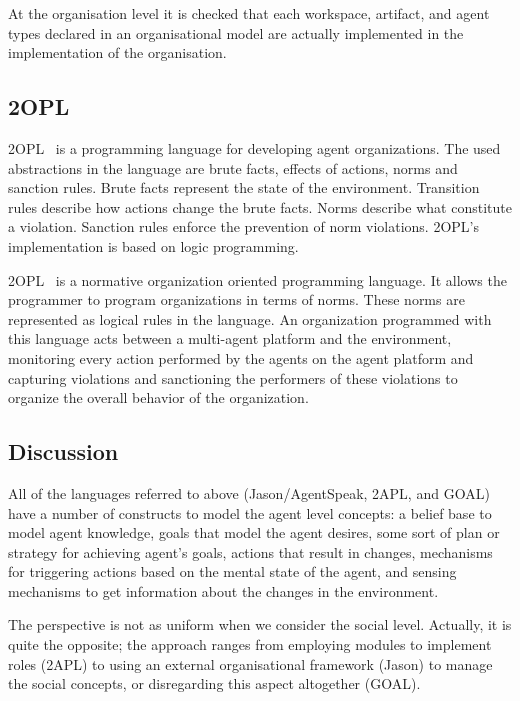 \documentclass[a4paper,12pt,oneside,fleqn]{book} %
\begin{document}
At the organisation level it is checked that each workspace, artifact, and
agent types declared in an organisational model are actually implemented in
the implementation of the organisation.

\subsection{2OPL} %

2OPL~\cite{DBLP:conf/atal/DybalovaTDL13} is a programming language for
developing agent organizations.  The used abstractions in the language are
brute facts, effects of actions, norms and sanction rules. Brute facts
represent the state of the environment.  Transition rules describe how
actions change the brute facts. Norms describe what constitute a violation.
Sanction rules enforce the prevention of norm violations. 2OPL's
implementation is based on logic programming.

2OPL~\cite{DBLP:conf/atal/DybalovaTDL13} is a normative organization
oriented programming language. It allows the programmer to program
organizations in terms of norms. These norms are represented as logical
rules in the language. An organization programmed with this language acts
between a multi-agent platform and the environment, monitoring every action
performed by the agents on the agent platform and capturing violations and
sanctioning the performers of these violations to organize the overall
behavior of the organization.


\subsection{Discussion} %

All of the languages referred to above (Jason/AgentSpeak, 2APL, and GOAL)
have a number of constructs to model the agent level concepts: a belief
base to model agent knowledge, goals that model the agent desires, some
sort of plan or strategy for achieving agent's goals, actions that
result in changes, mechanisms for triggering actions based on the mental
state of the agent, and sensing mechanisms to get information about the changes
in the environment.

The perspective is not as uniform when we consider the social level.
Actually, it is quite the opposite; the approach ranges from employing
modules to implement roles (2APL) to using an external organisational framework
(Jason) to manage the social concepts, or disregarding this aspect
altogether (GOAL).
\end{document}
